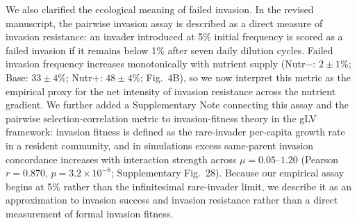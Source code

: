 We also clarified the ecological meaning of failed invasion. In the revised manuscript, the pairwise invasion assay is described as a direct measure of invasion resistance: an invader introduced at 5\% initial frequency is scored as a failed invasion if it remains below 1\% after seven daily dilution cycles. Failed invasion frequency increases monotonically with nutrient supply (Nutr$-$: $2 \pm 1\%$; Base: $33 \pm 4\%$; Nutr$+$: $48 \pm 4\%$; Fig.~4B), so we now interpret this metric as the empirical proxy for the net intensity of invasion resistance across the nutrient gradient. We further added a Supplementary Note connecting this assay and the pairwise selection-correlation metric to invasion-fitness theory in the gLV framework: invasion fitness is defined as the rare-invader per-capita growth rate in a resident community, and in simulations excess same-parent invasion concordance increases with interaction strength across $\mu = 0.05$--$1.20$ (Pearson $r = 0.870$, $p = 3.2 \times 10^{-8}$; Supplementary Fig.~28). Because our empirical assay begins at 5\% rather than the infinitesimal rare-invader limit, we describe it as an approximation to invasion success and invasion resistance rather than a direct measurement of formal invasion fitness.

